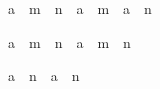 \begin{isabellebody}
\begin{isamarkuptext}
\begin{isabelle}%
a\ {\isacharcircum}\ {\isacharparenleft}m\ {\isacharplus}\ n{\isacharparenright}\ {\isacharequal}\ a\ {\isacharcircum}\ m\ {\isacharasterisk}\ a\ {\isacharcircum}\ n%
\end{isabelle}

\begin{isabelle}%
a\ {\isacharcircum}\ {\isacharparenleft}m\ {\isacharasterisk}\ n{\isacharparenright}\ {\isacharequal}\ {\isacharparenleft}a\ {\isacharcircum}\ m{\isacharparenright}\ {\isacharcircum}\ n%
\end{isabelle}

\begin{isabelle}%
{\isasymbar}a\ {\isacharcircum}\ n{\isasymbar}\ {\isacharequal}\ {\isasymbar}a{\isasymbar}\ {\isacharcircum}\ n%
\end{isabelle}
%
\end{isamarkuptext}%
\isamarkuptrue%
\isanewline
\isamarkupfalse%
\end{isabellebody}%
